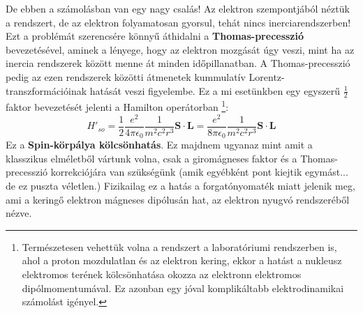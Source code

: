\documentclass[../main.tex]{subfiles}
\begin{document}
De ebben a számolásban van egy nagy csalás! Az elektron szempontjából néztük a rendszert, de az elektron folyamatosan gyorsul, tehát nincs inerciarendszerben! Ezt a problémát szerencsére könnyű áthidalni a \textbf{Thomas-precesszió} bevezetésével,
aminek a lényege, hogy az elektron mozgását úgy veszi, mint ha az inercia rendszerek között menne át minden időpillanatban. A Thomas-precesszió pedig az ezen rendszerek közötti átmenetek kummulatív Lorentz-transzformációinak hatását veszi figyelembe.
Ez a mi esetünkben egy egyszerű $\frac{1}{2}$ faktor bevezetését jelenti a Hamilton operátorban
\footnote{Természetesen vehettük volna a rendszert a laboratóriumi rendszerben is, ahol a proton mozdulatlan és az elektron kering, ekkor a hatást a nukleusz elektromos terének kölcsönhatása okozza az elektronn elektromos dipólmomentumával. Ez azonban egy jóval komplikáltabb elektrodinamikai számolást igényel.}:
\begin{equation}
    H'_{so} = \frac{1}{2} \frac{e^2}{4 \pi \epsilon_0} \frac{1}{m^2 c^2 r^3} \mathbf{S} \cdot \mathbf{L} = \frac{e^2}{8 \pi \epsilon_0} \frac{1}{m^2 c^2 r^3} \mathbf{S} \cdot \mathbf{L}
\end{equation}
Ez a \textbf{Spin-körpálya kölcsönhatás}. Ez majdnem ugyanaz mint amit a klasszikus elméletből vártunk volna, csak a giromágneses faktor és a Thomas-precesszió korrekciójára van szükségünk (amik egyébként pont kiejtik egymást... de ez puszta véletlen.)
Fizikailag ez a hatás a forgatónyomaték miatt jelenik meg, ami a keringő elektron mágneses dipólusán hat, az elektron nyugvó rendszeréből nézve.
\end{document}
